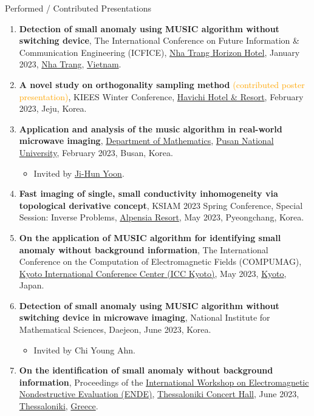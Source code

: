\documentclass{resume} %
\begin{document}
\begin{rSection}{Performed / Contributed Presentations}
\begin{enumerate}
\item\label{P-ICFICE2023} \textbf{Detection of small anomaly using MUSIC algorithm without switching device}, The  International Conference on Future Information \& Communication Engineering (ICFICE), \href{https://nhatranghorizon.com}{Nha Trang Horizon Hotel}, January 2023, \href{https://nhatrang.khanhhoa.gov.vn/english-page}{Nha Trang}, \href{https://vietnam.gov.vn}{Vietnam}.
\item\label{P-KIEES2023A} \textbf{A novel study on orthogonality sampling method} \textcolor{orange}{(contributed poster presentation)}, KIEES Winter Conference, \href{https://www.haevichi.com/jeju/en/}{Havichi Hotel \& Resort}, February 2023, Jeju, Korea.
\item\label{P-PNU2023} \textbf{Application and analysis of the music algorithm in real-world microwave imaging}, \href{https://math.pusan.ac.kr/math/index.do}{Department of Mathematics}, \href{https://www.pusan.ac.kr/}{Pusan National University}, February 2023, Busan, Korea.
\begin{itemize}
\item Invited by \href{https://fmath613.pusan.ac.kr/fmath613/index.do}{Ji-Hun Yoon}.
\end{itemize}
\item\label{P-KSIAM2023} \textbf{Fast imaging of single, small conductivity inhomogeneity via topological derivative concept}, KSIAM 2023 Spring Conference, Special Session: Inverse Problems, \href{https://www.alpensia.com/main.do}{Alpensia Resort}, May 2023, Pyeongchang, Korea.
\item\label{C-COMPUMAG2023} \textbf{On the application of MUSIC algorithm for identifying small anomaly without background information}, The  International Conference on the Computation of Electromagnetic Fields (COMPUMAG), \href{https://www.icckyoto.or.jp/en/}{Kyoto International Conference Center (ICC Kyoto)}, May 2023, \href{https://www.city.kyoto.lg.jp}{Kyoto}, Japan.
\item\label{P-NIMS2023A} \textbf{Detection of small anomaly using MUSIC algorithm without switching device in microwave imaging}, National Institute for Mathematical Sciences, Daejeon, June 2023, Korea.
    \begin{itemize}
\item Invited by Chi Young Ahn.
\end{itemize}
\item\label{P-ENDE2023} \textbf{On the identification of small anomaly without background information}, Proceedings of the \href{https://www.ende2023.gr}{ International Workshop on Electromagnetic Nondestructive Evaluation (ENDE)}, \href{https://www.tch.gr/default.aspx?lang=en-GB&page=1}{Thessaloniki Concert Hall}, June 2023, \href{https://thessaloniki.travel}{Thessaloniki}, \href{https://www.visitgreece.gr}{Greece}.

\end{enumerate}
\end{rSection}
\end{document}
